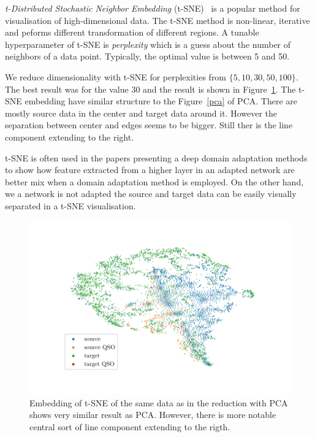 \textit{t-Distributed Stochastic Neighbor Embedding} (t-SNE)~\cite{maaten2008, wattenberg2016} is a popular method for visualisation of high-dimensional data.
The t-SNE method is non-linear, iterative
and peforms different transformation of different regions.
A tunable hyperparameter of t-SNE is \textit{perplexity}
which is a guess about the number of neighbors of a data point.
Typically, the optimal value is between 5 and 50.

We reduce dimensionality with t-SNE for perplexities from \(\{5, 10, 30, 50, 100\}\).
The best result was for the value 30
and the result is shown in Figure~\ref{tsne}.
The t-SNE embedding have similar structure to the Figure~\ref{pca} of PCA.
There are mostly source data in the center and target data around it.
However the separation between center and edges seems to be bigger.
Still ther is the line component extending to the right.

t-SNE is often used in the papers presenting a deep domain adaptation methods
to show how feature extracted from a higher layer in an adapted network
are better mix when a domain adaptation method is employed.
On the other hand, we a network is not adapted the source and target data
can be easily visually separated in a t-SNE visualisation.

\begin{figure}
\includegraphics[width=\textwidth]{img/tsne.pdf}
\caption[t-SNE visualisation of source and target data distributions]{
	Embedding of t-SNE of the same data
	as in the reduction with PCA shows very similar result as PCA.
	However, there is more notable central sort of line component
	extending to the rigth.
	}
\label{tsne}
\end{figure}

